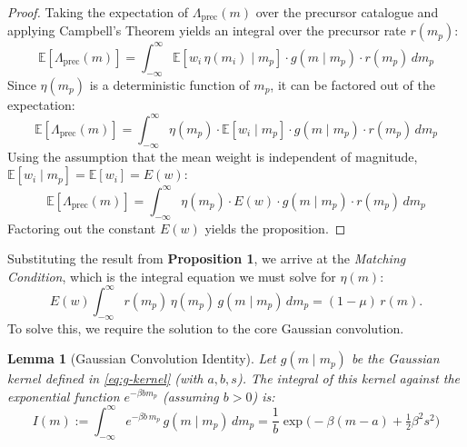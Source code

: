 \documentclass[extra,mreferee]{gji}
\theoremstyle{lemma}
\newtheorem{lemma}{Lemma}
\newcommand{\E}{\mathbb{E}}
\begin{document}
\begin{proof}
Taking the expectation of \(\Lambda_{\mathrm{prec}}(m)\) over the precursor catalogue and applying Campbell's Theorem yields an integral over the precursor rate \(r(m_p)\):
\[
\E[\Lambda_{\mathrm{prec}}(m)] = \int_{-\infty}^{\infty} \E[w_i \, \eta(m_i) \mid m_p] \cdot g(m \mid m_p) \cdot r(m_p) \, dm_p
\]
Since \(\eta(m_p)\) is a deterministic function of \(m_p\), it can be factored out of the expectation:
\[
\E[\Lambda_{\mathrm{prec}}(m)] = \int_{-\infty}^{\infty} \eta(m_p) \cdot \E[w_i \mid m_p] \cdot g(m \mid m_p) \cdot r(m_p) \, dm_p
\]
Using the assumption that the mean weight is independent of magnitude, \(\E[w_i \mid m_p] = \E[w_i] = E(w)\):
\[
\E[\Lambda_{\mathrm{prec}}(m)] = \int_{-\infty}^{\infty} \eta(m_p) \cdot E(w) \cdot g(m \mid m_p) \cdot r(m_p) \, dm_p
\]
Factoring out the constant \(E(w)\) yields the proposition.
\end{proof}

Substituting the result from \textbf{Proposition 1}, we arrive at the \emph{Matching Condition}, which is the integral equation we must solve for $\eta(m)$:
\begin{equation}\label{eq:eta-match}
E(w)\int_{-\infty}^{\infty} r(m_p)\,\eta(m_p)\,g(m\mid m_p)\,dm_p=(1-\mu)\,r(m).
\end{equation}
To solve this, we require the solution to the core Gaussian convolution.

\begin{lemma}[Gaussian Convolution Identity]
Let \(g(m \mid m_p)\) be the Gaussian kernel defined in \eqref{eq:g-kernel} (with \(a, b, s\)). The integral of this kernel against the exponential function \(e^{-\beta b m_p}\) (assuming \(b>0\)) is:
\[
I(m) := \int_{-\infty}^{\infty} e^{-\beta b\,m_p} \, g(m\mid m_p) \,dm_p = \frac{1}{b}\exp\!\Big(-\beta(m-a)+\tfrac{1}{2}\beta^2 s^2\Big)
\]
\end{lemma}
\end{document}
